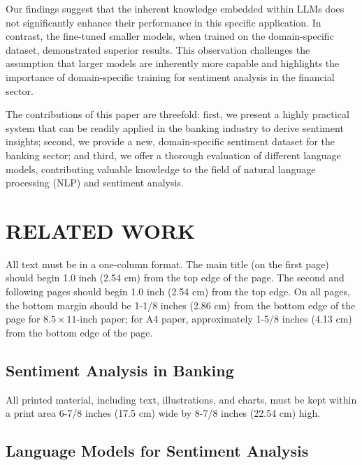 {Our findings suggest that the inherent knowledge embedded within LLMs does not significantly enhance their performance in this specific application. In contrast, the fine-tuned smaller models, when trained on the domain-specific dataset, demonstrated superior results. This observation challenges the assumption that larger models are inherently more capable and highlights the importance of domain-specific training for sentiment analysis in the financial sector.

The contributions of this paper are threefold: first, we present a highly practical system that can be readily applied in the banking industry to derive sentiment insights; second, we provide a new, domain-specific sentiment dataset for the banking sector; and third, we offer a thorough evaluation of different language models, contributing valuable knowledge to the field of natural language processing (NLP) and sentiment analysis.

\section{RELATED WORK}

All text must be in a one-column format. The main title (on the first page) should begin 1.0 inch (2.54 cm) from the top edge of the page. The second and following pages should begin 1.0 inch (2.54 cm) from the top edge. On all pages, the bottom margin should be 1-1/8 inches (2.86 cm) from the bottom edge of the page for $8.5 \times 11$-inch paper; for A4 paper, approximately 1-5/8 inches (4.13 cm) from the bottom edge of the page.

\subsection{Sentiment Analysis in Banking}

All printed material, including text, illustrations, and charts, must be kept within a print area 6-7/8 inches (17.5 cm) wide by 8-7/8 inches (22.54 cm) high.

\subsection{Language Models for Sentiment Analysis}

}
